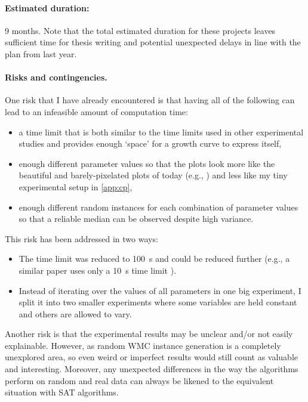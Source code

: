 \documentclass{article}
\begin{document}
{\paragraph{Estimated duration:} 9 months. Note that the total estimated duration
for these projects leaves sufficient time for thesis writing and potential
unexpected delays in line with the plan from last year.

\paragraph{Risks and contingencies.} One risk that I have already encountered is
that having all of the following can lead to an infeasible amount of computation
time:
\begin{itemize}
\item a time limit that is both similar to the time limits used in other
  experimental studies and provides enough `space' for a growth curve to express
  itself,
\item enough different parameter values so that the plots look more like the
  beautiful and barely-pixelated plots of today (e.g.,
  \cite{DBLP:conf/cp/McCreeshPP19,DBLP:journals/jair/McCreeshPST18}) and less
  like my tiny experimental setup in \cref{app:cp},
\item enough different random instances for each combination of parameter values
  so that a reliable median can be observed despite high variance.
\end{itemize}
This risk has been addressed in two ways:
\begin{itemize}
\item The time limit was reduced to \SI{100}{\second} and could be reduced
  further (e.g., a similar paper uses only a \SI{10}{\second} time limit
  \cite{DBLP:conf/ijcai/DudekMV17}).
\item Instead of iterating over the values of all parameters in one big
  experiment, I split it into two smaller experiments where some variables are
  held constant and others are allowed to vary.
\end{itemize}
Another risk is that the experimental results may be unclear and/or not easily
explainable. However, as random WMC instance generation is a completely
unexplored area, so even weird or imperfect results would still count as
valuable and interesting. Moreover, any unexpected differences in the way the
algorithms perform on random and real data can always be likened to the
equivalent situation with SAT algorithms.

}
\end{document}
